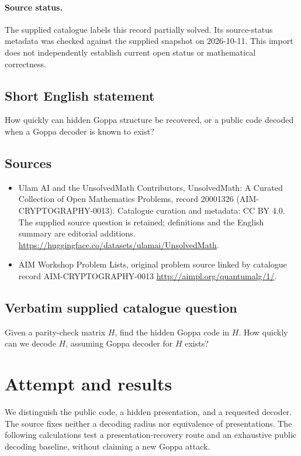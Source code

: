 \documentclass[11pt]{article}
\begin{document}
\paragraph{Source status.}
The supplied catalogue labels this record partially solved. Its source-status metadata was checked against the supplied snapshot on 2026-10-11. This import does not independently establish current open status or mathematical correctness.
\subsection{Short English statement}
How quickly can hidden Goppa structure be recovered, or a public code decoded when a Goppa decoder is known to exist?
\subsection{Sources}
\begin{itemize}
\item[S1] Ulam AI and the UnsolvedMath Contributors, UnsolvedMath: A Curated Collection of Open Mathematics Problems, record 20001326 (AIM-CRYPTOGRAPHY-0013). Catalogue curation and metadata: CC BY 4.0. The supplied source question is retained; definitions and the English summary are editorial additions.
\url{https://huggingface.co/datasets/ulamai/UnsolvedMath}.
\item[S2] AIM Workshop Problem Lists, original problem source linked by catalogue record AIM-CRYPTOGRAPHY-0013
\url{http://aimpl.org/quantumalg/1/}.
\end{itemize}
\subsection{Verbatim supplied catalogue question}
Given a parity-check matrix $H$, find the hidden Goppa code in $H$. How quickly can we decode $H$, assuming Goppa decoder for $H$ exists?

\section{Attempt and results}
We distinguish the public code, a hidden presentation, and a requested decoder.
The source fixes neither a decoding radius nor equivalence of presentations.
The following calculations test a presentation-recovery route and an exhaustive
public decoding baseline, without claiming a new Goppa attack.
\end{document}
